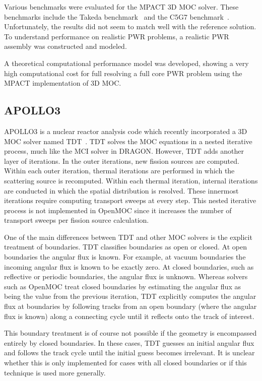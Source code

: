 Various benchmarks were evaluated for the MPACT 3D \ac{MOC} solver. These benchmarks include the Takeda benchmark~\cite{takeda} and the C5G7 benchmark~\cite{c5g7}. Unfortunately, the results did not seem to match well with the reference solution. To understand performance on realistic \ac{PWR} problems, a realistic \ac{PWR} assembly was constructed and modeled. 

A theoretical computational performance model was developed, showing a very high computational cost for full resolving a full core \ac{PWR} problem using the MPACT implementation of 3D \ac{MOC}.

\subsection{APOLLO3}
\label{sec:apollo3}

APOLLO3 is a nuclear reactor analysis code which recently incorporated a 3D \ac{MOC} solver named TDT~\cite{Sciannandrone2016}. TDT solves the \ac{MOC} equations in a nested iterative process, much like the MCI solver in DRAGON. However, TDT adds another layer of iterations. In the outer iterations, new fission sources are computed. Within each outer iteration, thermal iterations are performed in which the scattering source is recomputed. Within each thermal iteration, internal iterations are conducted in which the spatial distribution is resolved. These innermost iterations require computing transport sweeps at every step. This nested iterative process is not implemented in OpenMOC since it increases the number of transport sweeps per fission source calculation. 

One of the main differences between TDT and other \ac{MOC} solvers is the explicit treatment of boundaries. TDT classifies boundaries as open or closed. At open boundaries the angular flux is known. For example, at vacuum boundaries the incoming angular flux is known to be exactly zero. At closed boundaries, such as reflective or periodic boundaries, the angular flux is unknown. Whereas solvers such as OpenMOC treat closed boundaries by estimating the angular flux as being the value from the previous iteration, TDT explicitly computes the angular flux at boundaries by following tracks from an open boundary (where the angular flux is known) along a connecting cycle until it reflects onto the track of interest.

This boundary treatment is of course not possible if the geometry is encompassed entirely by closed boundaries. In these cases, TDT guesses an initial angular flux and follows the track cycle until the initial guess becomes irrelevant. It is unclear whether this is only implemented for cases with all closed boundaries or if this technique is used more generally.

